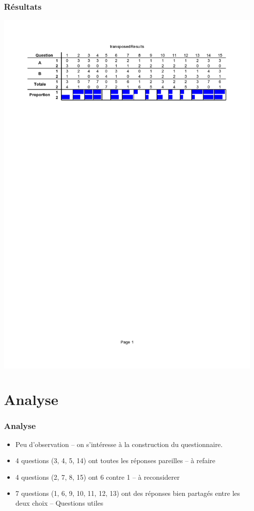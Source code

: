 \documentclass{beamer}
\begin{document}
\begin{frame}
  \frametitle{Résultats}

  \begin{center}
\hspace*{-1.5cm}\includegraphics[scale=0.5]{transposedResults}%
\end{center}
  \end{frame}


\section{Analyse}
\begin{frame}
  \frametitle{Analyse}
  \begin{itemize}
  \item Peu d'observation -- on s'intéresse à la construction du questionnaire.
  \item 4 questions (3, 4, 5, 14) ont toutes les réponses pareilles -- à refaire
  \item 4 questions (2, 7, 8, 15) ont 6 contre 1 -- à reconsiderer
  \item 7 questions (1, 6, 9, 10, 11, 12, 13) ont des réponses bien partagés
    entre les deux choix -- Questions utiles
  \end{itemize}
\end{frame}
\end{document}
